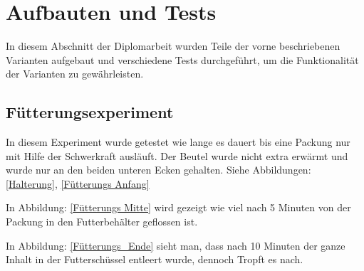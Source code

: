 \section{Aufbauten und Tests}

In diesem Abschnitt der Diplomarbeit wurden Teile der vorne beschriebenen Varianten aufgebaut und verschiedene Tests durchgeführt, um die Funktionalität der Varianten zu gewährleisten. \\

\subsection{Fütterungsexperiment} 

In diesem Experiment wurde getestet wie lange es dauert bis eine Packung nur mit Hilfe der Schwerkraft ausläuft. Der Beutel wurde nicht extra erwärmt und wurde nur an den beiden unteren Ecken gehalten. Siehe Abbildungen: \ref{Halterung}, \ref{Fütterungs Anfang} 

In Abbildung: \ref{Fütterungs Mitte} wird gezeigt wie viel nach 5 Minuten von der Packung in den Futterbehälter geflossen ist.

In Abbildung: \ref{Fütterungs_Ende} sieht man, dass nach 10 Minuten der ganze Inhalt in der Futterschüssel entleert wurde, dennoch Tropft es nach.


